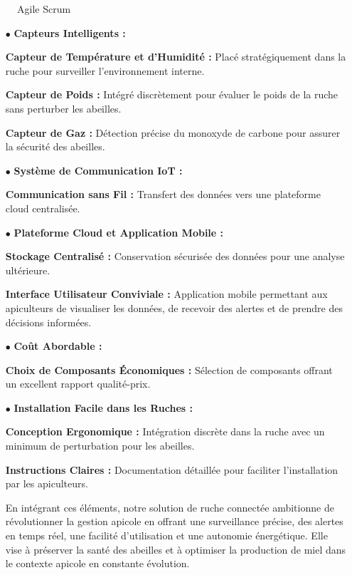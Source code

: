 \documentclass[a4paper,12pt]{report}
\begin{document}
\begin{figure} [H]
	\begin{center}
		\centering
		\hspace*{-1.5cm}
	\end{center}
	\caption{Agile Scrum}
\end{figure}
\begin{itemize}
\item [$\bullet$] \textbf{Capteurs Intelligents :}

\textbf{Capteur de Température et d'Humidité :} Placé stratégiquement dans la ruche pour surveiller l'environnement interne.

\textbf{Capteur de Poids :} Intégré discrètement pour évaluer le poids de la ruche sans perturber les abeilles.

\textbf{Capteur de Gaz :} Détection précise du monoxyde de carbone pour assurer la sécurité des abeilles.

\item [$\bullet$] \textbf{Système de Communication IoT :}

\textbf{Communication sans Fil :} Transfert des données vers une plateforme cloud centralisée.

\item [$\bullet$] \textbf{Plateforme Cloud et Application Mobile :}

\textbf{Stockage Centralisé :} Conservation sécurisée des données pour une analyse ultérieure.

\textbf{Interface Utilisateur Conviviale :} Application mobile permettant aux apiculteurs de visualiser les données, de recevoir des alertes et de prendre des décisions informées.


\item [$\bullet$] \textbf{Coût Abordable :}

\textbf{Choix de Composants Économiques :} Sélection de composants offrant un excellent rapport qualité-prix.


\item [$\bullet$] \textbf{Installation Facile dans les Ruches :}

\textbf{Conception Ergonomique :} Intégration discrète dans la ruche avec un minimum de perturbation pour les abeilles.

\textbf{Instructions Claires :} Documentation détaillée pour faciliter l'installation par les apiculteurs.

En intégrant ces éléments, notre solution de ruche connectée ambitionne de révolutionner la gestion apicole en offrant une surveillance précise, des alertes en temps réel, une facilité d'utilisation et une autonomie énergétique. Elle vise à préserver la santé des abeilles et à optimiser la production de miel dans le contexte apicole en constante évolution.
\end{itemize}
\end{document}
